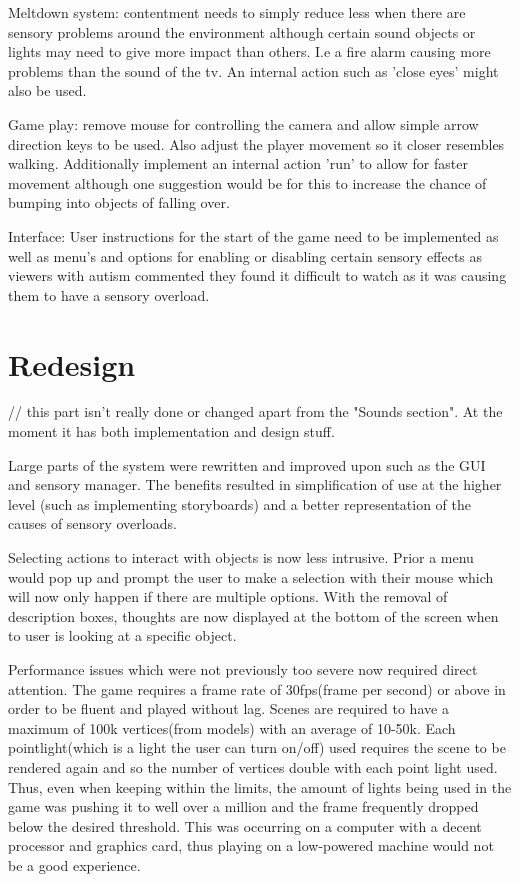 \documentclass[11pt]{report}
\begin{document}
Meltdown system: contentment needs to simply reduce less when there are sensory problems around the environment although certain sound objects or lights may need to give more impact than others. I.e a fire alarm causing more problems than the sound of the tv. An internal action such as 'close eyes' might also be used. 

Game play: remove mouse for controlling the camera and allow simple arrow direction keys to be used. Also adjust the player movement so it closer resembles walking. Additionally implement an internal action 'run' to allow for faster movement although one suggestion would be for this to increase the chance of bumping into objects of falling over. 

Interface: User instructions for the start of the game need to be implemented as well as menu's and options for enabling or disabling certain sensory effects as viewers with autism commented they found it difficult to watch as it was causing them to have a sensory overload. 


\chapter{Redesign}
// this part isn't really done or changed apart from the "Sounds section". At the moment it has both implementation and design stuff.

Large parts of the system were rewritten and improved upon such as the GUI and sensory manager. The benefits resulted in simplification of use at the higher level (such as implementing storyboards) and a better representation of the causes of sensory overloads.

Selecting actions to interact with objects is now less intrusive. Prior a menu would pop up and prompt the user to make a selection with their mouse which will now only happen if there are multiple options. With the removal of description boxes, thoughts are now displayed at the bottom of the screen when to user is looking at a specific object.

Performance issues which were not previously too severe now required direct attention. The game requires a frame rate of 30fps(frame per second) or above in order to be fluent and played without lag. Scenes are required to have a maximum of 100k vertices(from models) with an average of 10-50k. Each pointlight(which is a light the user can turn on/off) used requires the scene to be rendered again and so the number of vertices double with each point light used. Thus, even when keeping within the limits, the amount of lights being used in the game was pushing it to well over a million and the frame frequently dropped below the desired threshold. This was occurring on a computer with a decent processor and graphics card, thus playing on a low-powered machine would not be a good experience.  
\end{document}
